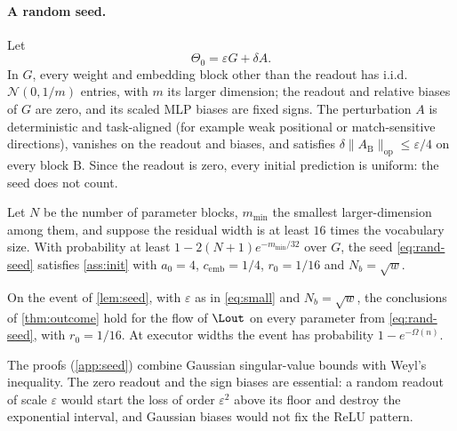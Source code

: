 \paragraph{A random seed.} Let
\begin{equation}\label{eq:rand-seed}
\Theta_0=\varepsilon G+\delta A .
\end{equation}
In $G$, every weight and embedding block other than the readout has i.i.d.\ $\mathcal N(0,1/m)$ entries, with $m$ its larger dimension; the readout and relative biases of $G$ are zero, and its scaled MLP biases are fixed signs. The perturbation $A$ is deterministic and task-aligned (for example weak positional or match-sensitive directions), vanishes on the readout and biases, and satisfies $\delta\|A_{\mathrm B}\|_{\mathrm{op}}\le\varepsilon/4$ on every block $\mathrm B$. Since the readout is zero, every initial prediction is uniform: the seed does not count.

\begin{lemma}\label{lem:seed}
Let $N$ be the number of parameter blocks, $m_{\min}$ the smallest larger-dimension among them, and suppose the residual width is at least $16$ times the vocabulary size. With probability at least $1-2(N+1)e^{-m_{\min}/32}$ over $G$, the seed \cref{eq:rand-seed} satisfies \cref{ass:init} with $a_0=4$, $c_{\mathrm{emb}}=1/4$, $r_0=1/16$ and $N_b=\sqrt w$.
\end{lemma}

\begin{proposition}\label{prop:random-plateau}
On the event of \cref{lem:seed}, with $\varepsilon$ as in \cref{eq:small} and $N_b=\sqrt w$, the conclusions of \cref{thm:outcome} hold for the flow of $\Lout$ on every parameter from \cref{eq:rand-seed}, with $r_0=1/16$. At executor widths the event has probability $1-e^{-\Omega(n)}$.
\end{proposition}
The proofs (\cref{app:seed}) combine Gaussian singular-value bounds \citep[Chapter~7]{vershynin2018high} with Weyl's inequality. The zero readout and the sign biases are essential: a random readout of scale $\varepsilon$ would start the loss of order $\varepsilon^2$ above its floor and destroy the exponential interval, and Gaussian biases would not fix the ReLU pattern.

